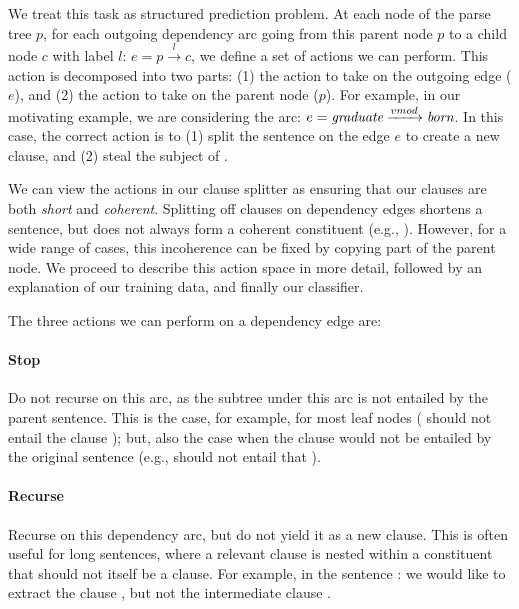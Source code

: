 We treat this task as structured prediction problem.
At each node of the parse tree $p$, for each outgoing dependency arc going
  from this parent node $p$ to a child node $c$ with label $l$:
  $e = p \xrightarrow{l} c$, we define a set of actions we can perform.
This action is decomposed into two parts: (1) the action to take on the outgoing
  edge ($e$), and (2) the action to take on the
  parent node ($p$).
For example, in our motivating example, we are considering the arc:
  $e = \textit{graduate} \xrightarrow{vmod} \textit{born}$.
In this case, the correct action is to
  (1) split the sentence on the edge $e$ to create a new clause,
  and (2) steal the subject of .

We can view the actions in our clause splitter as ensuring that our
  clauses are both \textit{short} and \textit{coherent}.
Splitting off clauses on dependency edges shortens a sentence, but does not
  always form a coherent constituent (e.g., ).
However, for a wide range of cases, this incoherence can be fixed by copying
  part of the parent node.
We proceed to describe this action space in more detail, followed by an
  explanation of our training data, and finally our classifier.

%
%
The three actions we can perform on a dependency edge are:

\paragraph{Stop} 
  Do not recurse on this arc, as the subtree under this arc is
    not entailed by the parent sentence.
  This is the case, for example, for most leaf nodes
    ( should not entail the clause );
    but, also the case when the clause would not be entailed by the original
    sentence (e.g., 
    should not entail that ).

\paragraph{Recurse}
  Recurse on this dependency arc, but do not yield it as a new clause.
  This is often useful for long sentences, where a relevant clause is nested
    within a constituent that should not itself be a clause.
  For example, in the sentence :
    we would like to extract the clause 
    , but not the intermediate
    clause .


